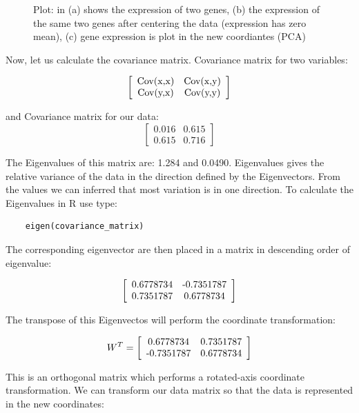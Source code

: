 \documentclass[11pt, oneside]{article}   	%
\begin{document}
\begin{figure}[!h]
\begin{subfigure}{0.45\textwidth}
		\caption{}
		\label{fig:PlotTwoGenesNewCoordiantes}
	\end{subfigure}
	\caption{Plot: in (a) shows the expression of two genes, (b) the expression of the same two genes after centering the data (expression has zero mean),  (c) gene expression is plot in the new coordiantes (PCA)}
	\label{fig:PlotData}
\end{figure}


Now, let us calculate the covariance matrix. Covariance matrix for two variables:

\[ \left[ \begin{array}{cc}
      $Cov(x,x)$ & $Cov(x,y)$\\ 
      $Cov(y,x)$ & $Cov(y,y)$
      \end{array} \right]
\]

\noindent and Covariance matrix for our data:
\[
   \left[ \begin{array}{cc}
      0.016 & 0.615 \\ 
      0.615 & 0.716
      \end{array} \right]
\]

The Eigenvalues of this matrix are:  1.284 and 0.0490. Eigenvalues gives the relative variance of the data in the direction defined by the Eigenvectors. From the values we can inferred that most variation is in one direction. To calculate the Eigenvalues in R use type:

\begin{framed}
\begin{verbatim}
	eigen(covariance_matrix)
\end{verbatim}
\end{framed}

The corresponding eigenvector are then placed in a matrix in descending order of eigenvalue:

\[
   \left[ \begin{array}{cc}
	0.6778734 & $-0.7351787$ \\
	0.7351787 & 0.6778734
      \end{array} \right]
\]

The transpose of this Eigenvectos will perform the coordinate transformation:

\[
   W^T = 
   \left[ \begin{array}{cc}
	0.6778734 & 0.7351787 \\
	$-0.7351787$ & 0.6778734
      \end{array} \right]
\]

\noindent This is an orthogonal matrix which performs a rotated-axis coordinate transformation.
We can transform our data matrix so that the data is represented in the new coordinates:  
\end{document}
